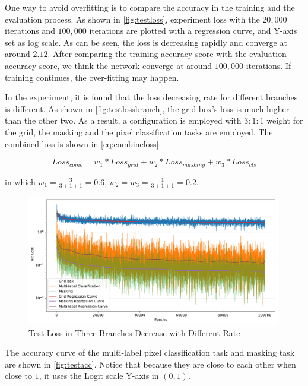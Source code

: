 \begin{spacing}{1.5}
One way to avoid overfitting is to compare the accuracy in the training and the evaluation process. As shown in \autoref{fig:testloss}, experiment loss with the $20,000$ iterations and $100,000$ iterations are plotted with a regression curve, and Y-axis set as log scale. As can be seen, the loss is decreasing rapidly and converge at around $2.12$. After comparing the training accuracy score with the evaluation accuracy score, we think the network converge at around $100,000$ iterations. If training continues, the over-fitting may happen.

In the experiment, it is found that the loss decreasing rate for different branches is different. As shown in \autoref{fig:testlossbranch}, the grid box's loss is much higher than the other two. As a result, a configuration is employed with $3:1:1$ weight for the grid, the masking and the pixel classification tasks are employed. The combined loss is shown in \autoref{eq:combineloss}.

\begin{equation}
\label{eq:combineloss}
    Loss_{comb}=w_1*{Loss_{grid}}+w_2*{Loss_{masking}}+w_3*{Loss_{cls}}
\end{equation}

in which $w_1=\frac{3}{3+1+1}=0.6$, $w_2=w_3=\frac{1}{3+1+1}=0.2$.

\begin{figure}[ht]
\centering
\includegraphics[width=0.99\textwidth, fbox]{Chapter5/testlossbranch.pdf}
\caption{Test Loss in Three Branches Decrease with Different Rate}
\label{fig:testlossbranch} 
\end{figure}

The accuracy curve of the multi-label pixel classification task and masking task are shown in \autoref{fig:testacc}. Notice that because they are close to each other when close to $1$, it uses the Logit scale Y-axis in $(0,1)$.


\end{spacing}
